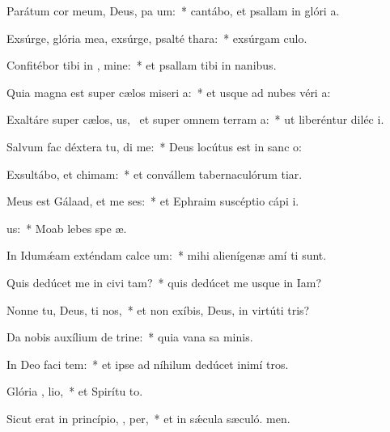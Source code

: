 \item Parátum cor meum, Deus, pa  um:~* cantábo, et psallam in glóri a.
\item Exsúrge, glória mea, exsúrge, psalté  thara:~* exsúrgam culo.
\item Confitébor tibi in , mine:~* et psallam tibi in nanibus.
\item Quia magna est super cælos miseri a:~* et usque ad nubes véri a:
\item Exaltáre super cælos, us,~\pscross{} et super omnem terram  a:~* ut liberéntur diléc i.
\item Salvum fac déxtera tu,  di me:~* Deus locútus est in sanc o:
\item Exsultábo, et  chimam:~* et convállem tabernaculórum tiar.
\item Meus est Gálaad, et me  ses:~* et Ephraim suscéptio cápi i.
\item {}  us:~* Moab lebes spe æ.
\item In Idumǽam exténdam calce um:~* mihi alienígenæ amí ti sunt.
\item Quis dedúcet me in civi tam?~* quis dedúcet me usque in Iam?
\item Nonne tu, Deus,  ti nos,~* et non exíbis, Deus, in virtúti tris?
\item Da nobis auxílium de trine:~* quia vana sa minis.
\item In Deo faci tem:~* et ipse ad níhilum dedúcet inimí tros.
\item Glória ,  lio,~* et Spirítu to.
\item Sicut erat in princípio,  ,  per,~* et in sǽcula sæculó. men.

